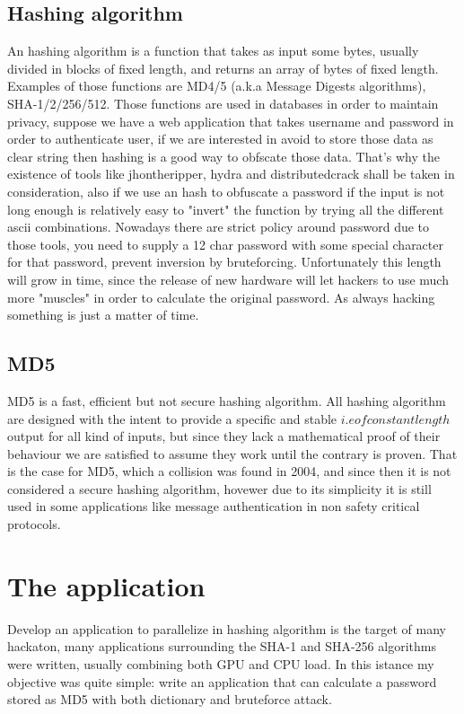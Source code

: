 \documentclass[12pt,a4paper]{article}
\begin{document}
\subsection{Hashing algorithm}
An hashing algorithm is a function that takes as input some bytes, usually divided in blocks of fixed length, and returns an array of bytes of fixed length. Examples of those functions are MD4/5 (a.k.a Message Digests algorithms), SHA-1/2/256/512. Those functions are used in databases in order to maintain privacy, suppose we have a web application that takes username and password in order to authenticate user, if we are interested in avoid to store those data as clear string then hashing is a good way to obfscate those data. That's why the existence of tools like jhontheripper, hydra and distributedcrack shall be taken in consideration, also if we use an hash to obfuscate a password if the input is not long enough is relatively easy to "invert" the function by trying all the different ascii combinations. Nowadays there are strict policy around password due to those tools, you need to supply a 12 char password with some special character for that password, prevent inversion by bruteforcing. Unfortunately this length will grow in time, since the release of new hardware will let hackers to use much more "muscles" in order to calculate the original password. As always hacking something is just a matter of time.

\subsection{MD5}
MD5 is a fast, efficient but not secure hashing algorithm. All hashing algorithm are designed with the intent to provide a specific and stable \(i.e of constant length\) output for all kind of inputs, but since they lack a mathematical proof of their behaviour we are satisfied to assume they work until the contrary is proven. That is the case for MD5, which a collision was found in 2004, and since then it is not considered a secure hashing algorithm, hovewer due to its simplicity it is still used in some applications like message authentication in non safety critical protocols.

\section{The application}
Develop an application to parallelize in hashing algorithm is the target of many hackaton, many applications surrounding the SHA-1 and SHA-256 algorithms were written, usually combining both GPU and CPU load. In this istance my objective was quite simple: write an application that can calculate a password stored as MD5 with both dictionary and bruteforce attack.
\end{document}
